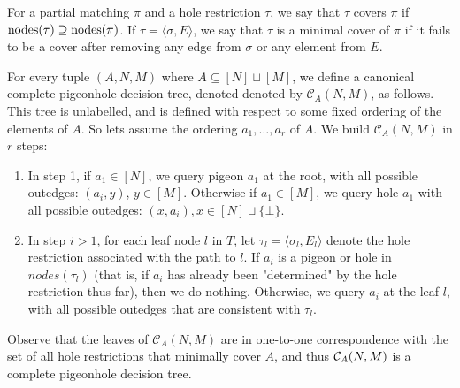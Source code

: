 \begin{definition} 
For a partial matching $\pi$ and a hole restriction $\tau$, we say that $\tau$ covers $\pi$ if $\mathrm{nodes}(\tau) \supseteq \mathrm{nodes}(\pi)$. If $\tau = \langle \sigma, E\rangle$, we say that $\tau$ is a minimal cover of $\pi$ if it fails to be a cover after removing any edge from $\sigma$ or any element from $E$.

For every tuple $(A,N,M)$ where $A \subseteq [N] \sqcup [M]$, 
we define a canonical complete pigeonhole decision tree, denoted denoted by $\mathcal{C}_A(N,M)$, as follows. This tree is unlabelled, and is defined with respect to some fixed ordering of the elements of $A$. So lets assume the ordering $a_1,\ldots,a_r$ of $A$. 
We build $\mathcal{C}_A(N,M)$ in $r$ steps:
\begin{enumerate}
    \item In step 1, if $a_1 \in [N]$, we query pigeon $a_1$ at the root, with all possible outedges: $(a_i,y)$, $y \in [M]$. Otherwise if $a_1 \in [M]$, we query hole $a_1$ with all possible outedges: $(x,a_i), x \in [N] \sqcup \{\bot\}$. 
    \item In step $i>1$, for each leaf node $l$ in $T$, let $\tau_l = \langle \sigma_l,E_l \rangle$ denote the hole restriction associated with the path to $l$.  If $a_i$ is a pigeon or hole in $nodes(\tau_l)$ (that is, if $a_i$ has already been "determined" by the hole restriction thus far), then we do nothing.  Otherwise,  we query $a_i$ at the leaf $l$, with all possible outedges that are consistent with $\tau_l$. 
    \end{enumerate}
\end{definition}
Observe that the leaves of $\mathcal{C}_A(N,M)$ are in one-to-one correspondence with the set of all hole restrictions that minimally cover $A$, and thus ${\cal C}_A(N,M)$ is a complete pigeonhole decision tree.

